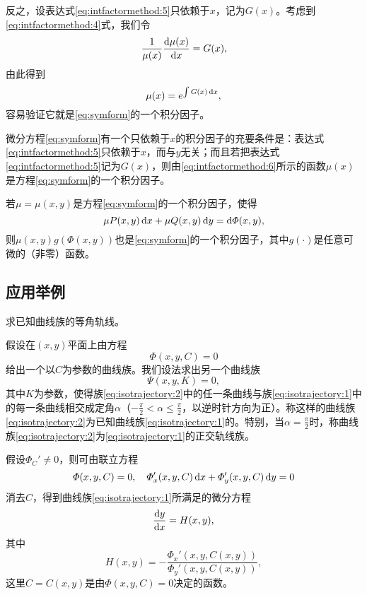 反之，设表达式\eqref{eq:intfactormethod:5}只依赖于$x$，记为$G(x)$。考虑到\eqref{eq:intfactormethod:4}式，我们令
\[
\frac{1}{\mu(x)}\frac{\mathrm{d}{}\mu(x)}{\mathrm{d}{}x}=G(x),
\]
由此得到
\begin{equation}\label{eq:intfactormethod:6}
\mu(x)=e^{\int G(x)\,\mathrm{d} x},
\end{equation}
容易验证它就是\eqref{eq:symform}的一个积分因子。
\begin{theo}\label{theo:intfactormethod:1}
微分方程\eqref{eq:symform}有一个只依赖于$x$的积分因子的充要条件是：表达式\eqref{eq:intfactormethod:5}只依赖于$x$，而与$y$无关；而且若把表达式\eqref{eq:intfactormethod:5}记为$G(x)$，则由\eqref{eq:intfactormethod:6}所示的函数$\mu(x)$是方程\eqref{eq:symform}的一个积分因子。
\end{theo}
\begin{theo}\label{theo:intfactormethod:2}
若$\mu=\mu(x,y)$是方程\eqref{eq:symform}的一个积分因子，使得
\[
\mu P(x,y)\,\mathrm{d} x+\mu Q(x,y)\,\mathrm{d} y=\mathrm{d}\varPhi(x,y),
\]
则$\mu(x,y)g(\varPhi(x,y))$也是\eqref{eq:symform}的一个积分因子，其中$g(\cdot)$是任意可微的（非零）函数。
\end{theo}

\subsection{应用举例}
\begin{example}
求已知曲线族的等角轨线。

假设在$(x,y)$平面上由方程
\begin{equation}\label{eq:isotrajectory:1}
\varPhi(x,y,C)=0
\end{equation}
给出一个以$C$为参数的曲线族。我们设法求出另一个曲线族
\begin{equation}\label{eq:isotrajectory:2}
\varPsi(x,y,K)=0,
\end{equation}
其中$K$为参数，使得族\eqref{eq:isotrajectory:2}中的任一条曲线与族\eqref{eq:isotrajectory:1}中的每一条曲线相交成定角$\alpha$（$-\tfrac{\pi}{2}<\alpha\leq\frac{\pi}{2}$，以逆时针方向为正）。称这样的曲线族\eqref{eq:isotrajectory:2}为已知曲线族\eqref{eq:isotrajectory:1}的。特别，当$\alpha=\tfrac{\pi}{2}$时，称曲线族\eqref{eq:isotrajectory:2}为\eqref{eq:isotrajectory:1}的正交轨线族。
\end{example}

假设$\varPhi_C'\neq 0$，则可由联立方程
\begin{equation}\label{eq:isotrajectory:3}
\varPhi(x,y,C)=0,\quad \varPhi_x'(x,y,C)\,\mathrm{d} x+\varPhi_y'(x,y,C)\,\mathrm{d} y=0
\end{equation}
消去$C$，得到曲线族\eqref{eq:isotrajectory:1}所满足的微分方程
\begin{equation}\label{eq:isotrajectory:4}
\frac{\mathrm{d}{}y}{\mathrm{d}{}x}=H(x,y),
\end{equation}
其中
\[
H(x,y)=-\frac{\varPhi_x'(x,y,C(x,y))}{\varPhi_y'(x,y,C(x,y))},
\]
这里$C=C(x,y)$是由$\varPhi(x,y,C)=0$决定的函数。


